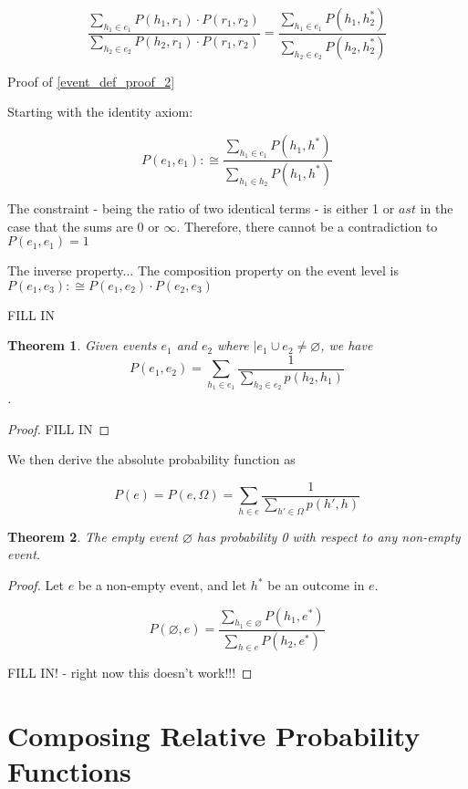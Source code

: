 \documentclass[twoside]{article}
\theoremstyle{plain}%
\newtheorem{theorem}{Theorem}[section]
\theoremstyle{definition}
\theoremstyle{remark}
\begin{document}
\[\frac{\sum_{h_1 \in e_1} P(h_1, r_1) \cdot P(r_1, r_2)}{\sum_{h_2 \in e_2} P(h_2, r_1) \cdot P(r_1, r_2)} = \frac{\sum_{h_1 \in e_1} P(h_1, h_2^*)}{\sum_{h_2 \in e_2} P(h_2, h_2^*)}\]

Proof of \ref{event_def_proof_2}

Starting with the identity axiom:

\[P(e_1, e_1) :\cong \frac{\sum_{h_1 \in e_1} P(h_1, h^*)}{\sum_{h_1 \in h_2} P(h_1, h^*)}\]

The constraint - being the ratio of two identical terms - is either 1 or \(ast\) in the case that the sums are \(0\) or \(\infty\). Therefore, there cannot be a contradiction to \(P(e_1, e_1) = 1\)

The inverse property...
The composition property on the event level is \(P(e_1, e_3) :\cong P(e_1, e_2) \cdot P(e_2, e_3)\)

FILL IN

\begin{theorem}
Given events \(e_1\) and \(e_2\) where \(|e_1 \cup e_2 \neq \varnothing\), we have \[P(e_1, e_2) = \sum_{h_1 \in e_1} \frac{1}{\sum_{h_2 \in e_2} p(h_2, h_1)}\].
\end{theorem}

\begin{proof}
FILL IN
\end{proof}

We then derive the absolute probability function as

\[P(e) = P(e, \Omega) = \sum_{h \in e} \frac{1}{\sum_{h' \in \Omega}p(h', h)}\]

\begin{theorem}
\label{theorem:empty_event_impossible}
The empty event \(\varnothing\) has probability 0 with respect to any non-empty event.
\end{theorem}

\begin{proof}
Let \(e\) be a non-empty event, and let \(h^*\) be an outcome in \(e\).

\[P(\varnothing, e) = \frac{\sum_{h_1 \in \varnothing} P(h_1, e^*)}{\sum_{h \in e} P(h_2, e^*)}\]

FILL IN! - right now this doesn't work!!!
\end{proof}

\section{Composing Relative Probability Functions}
\end{document}
